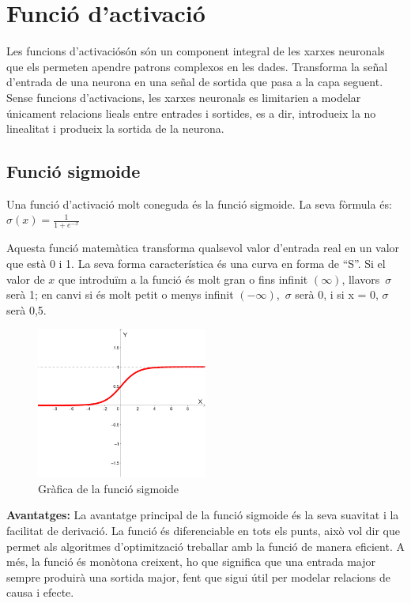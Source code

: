 \section{Funció d'activació}\label{sec:3.5.3}
Les funcions d'activaciósón són un component integral de les xarxes neuronals que els permeten apendre patrons complexos en les dades. Transforma la señal d'entrada de una neurona en una señal de sortida que pasa a la capa seguent. Sense funcions d'activacions, les xarxes neuronals es limitarien a modelar únicament relacions lieals entre entrades i sortides, es a dir, introdueix la no linealitat i produeix la sortida de la neurona.
\subsection{Funció sigmoide}
Una funció d'activació molt coneguda és la funció sigmoide.
La seva fòrmula és: \(\sigma(x) = \frac{1}{1 + e^{-x}}\)

Aquesta funció matemàtica transforma qualsevol valor d'entrada real en un valor que està 0 i 1. La seva forma característica és una curva en forma de ``S''. Si el valor de $x$ que introduïm a la funció és molt gran o fins infinit $(\infty)$, llavors\ $\sigma$ serà 1; en canvi si és molt petit o menys infinit $(-\infty)$,\ $\sigma$ serà 0, i si x = 0,  $\sigma$  serà 0,5.

\begin{figure}[h!]
    \centering
    \includegraphics[width=0.5\textwidth]{./figures/grafica_sigmoide.png}
    \caption{Gràfica de la funció sigmoide}
\end{figure}

\textbf{Avantatges:}
La avantatge principal de la funció sigmoide és la seva suavitat i la facilitat de derivació. La funció és diferenciable en tots els punts, això vol dir que permet als algoritmes d'optimització treballar amb la funció de manera eficient. A més, la funció és monòtona creixent, ho que significa que una entrada major sempre produirà una sortida major, fent que sigui útil per modelar relacions de causa i efecte.

